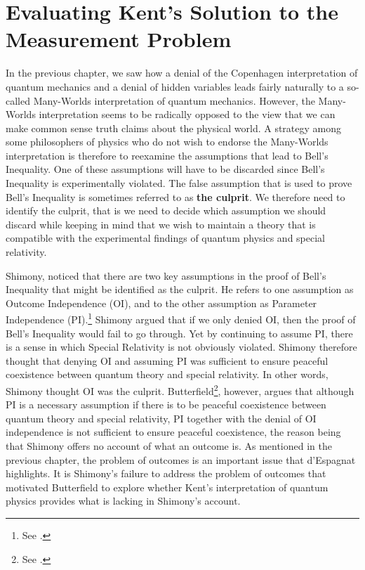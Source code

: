 \chapter{Evaluating Kent's Solution to the Measurement Problem}


In the previous chapter, we saw how a denial of the Copenhagen interpretation of quantum mechanics and a denial of hidden variables leads fairly naturally to a so-called Many-Worlds interpretation of quantum mechanics. However, the Many-Worlds interpretation seems to be radically opposed to the view that we can make common sense truth claims about the physical world. A strategy among some philosophers of physics who do not wish to endorse the Many-Worlds interpretation is therefore to reexamine the assumptions that lead to Bell's Inequality. One of these assumptions will have to be discarded since Bell's Inequality is experimentally violated. The false assumption that is used to prove Bell's Inequality is sometimes referred to as \textbf{the culprit}. We therefore need to identify the culprit, that is we need to decide which assumption we should discard while keeping in mind that we wish to maintain a theory that is compatible with the experimental findings of quantum physics and special relativity.

Shimony, noticed that there are two key assumptions in the proof of Bell's Inequality that might be identified as the culprit. He refers to one assumption as {Outcome Independence} (OI), and to the other assumption as {Parameter Independence} (PI).\footnote{See \cite[146-147]{Shimony86}.} Shimony argued that if we only denied OI, then the proof of Bell's Inequality would fail to go through. Yet by continuing to assume PI, there is a sense in which Special Relativity is not obviously violated. Shimony therefore thought that denying OI and assuming PI was sufficient to ensure peaceful coexistence between quantum theory and special relativity. In other words, Shimony thought OI was the culprit. Butterfield\footnote{See \cite{Butterfield}.}, however, argues that although PI is a necessary assumption if there is to be peaceful coexistence between quantum theory and special relativity, PI together with the denial of OI independence is not sufficient to ensure peaceful coexistence, the reason being that Shimony offers no account of what an outcome is. As mentioned in the previous chapter, the problem of outcomes is an important issue that d'Espagnat highlights.
It is Shimony's failure to address the problem of outcomes that motivated Butterfield to explore whether Kent's interpretation of quantum physics provides what is lacking in Shimony's account. 

